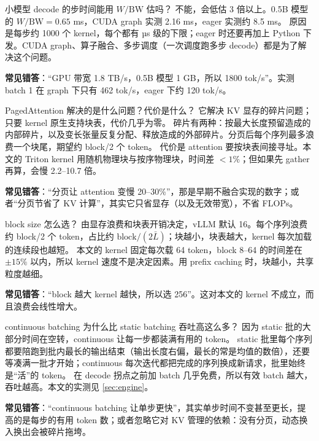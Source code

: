 \documentclass[11pt,a4paper]{ctexart}
\begin{document}
\begin{iqbox}{小模型 decode 的步时间能用 $W/\text{BW}$ 估吗？}
不能，会低估 3 倍以上。0.5B 模型的 $W/\text{BW}=0.65$ ms，CUDA graph 实测 2.16 ms，eager 实测约 8.5 ms。
原因是每步约 1000 个 kernel，每个都有 µs 级的下限；eager 时还要再加上 Python 下发。CUDA graph、算子融合、多步调度（一次调度跑多步 decode）都是为了解决这个问题。
\par\textbf{常见错答}：“GPU 带宽 1.8 TB/s，0.5B 模型 1 GB，所以 1800 tok/s”。实测 batch 1 在 graph 下只有 462 tok/s，eager 下约 120 tok/s。
\end{iqbox}

\begin{iqbox}{PagedAttention 解决的是什么问题？代价是什么？}
它解决 KV 显存的碎片问题；只要 kernel 原生支持块表，代价几乎为零。
碎片有两种：按最大长度预留造成的内部碎片，以及变长张量反复分配、释放造成的外部碎片。分页后每个序列最多浪费一个块尾，期望约 block/2 个 token。
代价是 attention 要按块表间接寻址。本文的 Triton kernel 用随机物理块与按序物理块，时间差 $<1\%$；但如果先 gather 再算，会慢 2.2--10.7 倍。
\par\textbf{常见错答}：“分页让 attention 变慢 20--30\%”，那是早期不融合实现的数字；或者“分页节省了 KV 计算”，其实它只省显存（以及无效带宽），不省 FLOPs。
\end{iqbox}

\begin{iqbox}{block size 怎么选？}
由显存浪费和块表开销决定，vLLM 默认 16。每个序列浪费约 block/2 个 token，占比约 $\text{block}/(2\bar L)$；块越小，块表越大，kernel 每次加载的连续段也越短。
本文的 kernel 固定每次载 64 token，block 8--64 的时间差在 $\pm15\%$ 以内，所以 kernel 速度不是决定因素。用 prefix caching 时，块越小，共享粒度越细。
\par\textbf{常见错答}：“block 越大 kernel 越快，所以选 256”。这对本文的 kernel 不成立，而且浪费会线性增大。
\end{iqbox}

\begin{iqbox}{continuous batching 为什么比 static batching 吞吐高这么多？}
因为 static 批的大部分时间在空转，continuous 让每一步都装满有用的 token。
static 批里每个序列都要陪跑到批内最长的输出结束（输出长度右偏，最长的常是均值的数倍），还要等凑满一批才开始；continuous 每次迭代都把完成的序列换成新请求，批里始终是“活”的 token。
在 decode 拐点之前加 batch 几乎免费，所以有效 batch 越大，吞吐越高。本文的实测见 \cref{sec:engine}。
\par\textbf{常见错答}：“continuous batching 让单步更快”，其实单步时间不变甚至更长，提高的是每步的有用 token 数；或者忽略它对 KV 管理的依赖：没有分页，动态换入换出会被碎片拖垮。
\end{iqbox}
\end{document}
